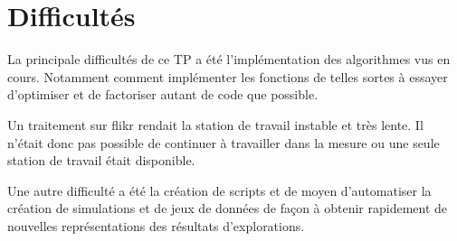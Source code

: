 \section{Difficultés}

La principale difficultés de ce TP a été l'implémentation des algorithmes vus en cours.
Notamment comment implémenter les fonctions de telles sortes à essayer d'optimiser et de factoriser
autant de code que possible.

Un traitement sur flikr rendait la station de travail instable et très lente. Il n'était donc pas possible
de continuer à travailler dans la mesure ou une seule station de travail était disponible.

Une autre difficulté a été la création de scripts et de moyen d'automatiser la création de simulations
et de jeux de données de façon à obtenir rapidement de nouvelles représentations des résultats d'explorations.
